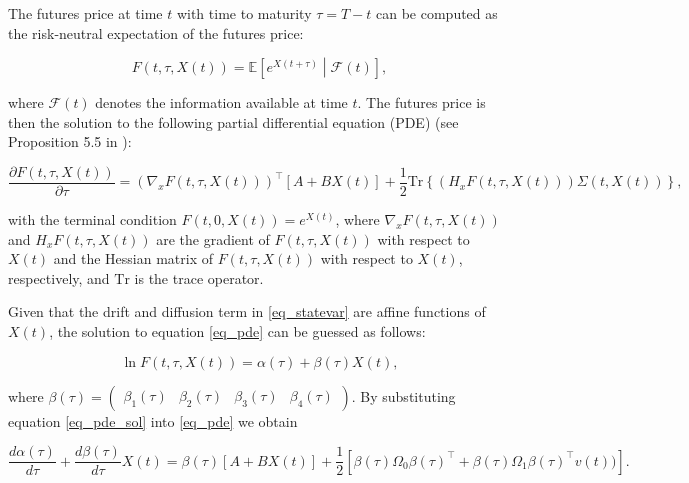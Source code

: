 \documentclass{article}
\begin{document}

The futures price at time $t$ with time to maturity $\tau=T-t$ can be computed as the risk-neutral expectation of the futures price:

\begin{equation*}
    F(t, \tau, X(t)) = \mathbb{E} \left[ e^{X(t+\tau)} \middle| \mathcal{F}(t) \right], 
\end{equation*}

\noindent where $\mathcal{F}(t)$  denotes the information available at time $t$. The futures price is then the solution to the following partial differential equation (PDE) (see Proposition 5.5 in \cite{bjork09}):

\begin{equation} \label{eq_pde}
     \frac{\partial F(t,\tau, X(t))}{\partial \tau} =  
     \left(\nabla_x F(t,\tau, X(t)) \right)^\top [A+B X(t)]
    + \frac{1}{2} \text{Tr}\left\{  \left(H_x F(t,\tau, X(t))\right) {\Sigma}(t, X(t)) \right\}, 
\end{equation}

\noindent with the terminal condition \(F(t, 0, {X}(t)) = e^{{X}(t)}\), where \(\nabla_x F(t, \tau, {X}(t))\) and \(H_x F(t, \tau, {X}(t))\) are the gradient of \(F(t, \tau, {X}(t))\) with respect to \({X}(t)\) and the Hessian matrix of \(F(t, \tau, {X}(t))\) with respect to \({X}(t)\), respectively, and \(\text{Tr}\) is the trace operator.


Given that the drift and diffusion term in \eqref{eq_statevar} are affine functions of $X(t)$, the solution to equation \eqref{eq_pde} can be guessed as follows:

\begin{equation} \label{eq_pde_sol}
    \ln F(t, \tau,  X(t) ) = {\alpha(\tau) + {\beta}(\tau) {X}(t)},
\end{equation}

\noindent where ${\beta}(\tau) = \begin{pmatrix}
\beta_{1}(\tau) & 
\beta_{2}(\tau) &
\beta_{3}(\tau) &
\beta_{4}(\tau)
\end{pmatrix}$. By substituting equation \eqref{eq_pde_sol} into \eqref{eq_pde} we obtain

\begin{equation*}
    \frac{d \alpha(\tau)}{d\tau} +  \frac{d {\beta(\tau)}}{d\tau}{X}(t) = {\beta(\tau)} [A + B X(t)] + \frac{1}{2} \left[ \beta(\tau) \Omega_0 \beta(\tau)^\top+ \beta(\tau) \Omega_1 \beta(\tau)^\top v(t) ) \right].
\end{equation*}
\end{document}
